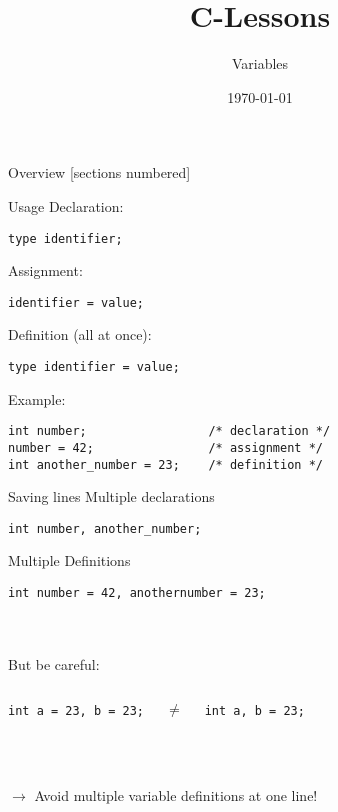 


\title{C-Lessons}
\subtitle{Variables}
\date{\today}



\begin{frame}
	\titlepage
\end{frame}
\begin{frame}{Overview}
	[sections numbered]
	\tableofcontents
\end{frame}

\begin{frame}[fragile]{Usage}
	Declaration:
	\begin{lstlisting}[numbers=none,basicstyle=\itshape\footnotesize]
type identifier;
\end{lstlisting}
	Assignment: 
	\begin{lstlisting}[numbers=none,basicstyle=\itshape\footnotesize]
identifier = value;
\end{lstlisting}
	Definition (all at once):
	\begin{lstlisting}[numbers=none,basicstyle=\itshape\footnotesize]
type identifier = value;
\end{lstlisting}
	Example:
	\begin{lstlisting}[numbers=none]
int number;                 /* declaration */
number = 42;                /* assignment */
int another_number = 23;    /* definition */

\end{lstlisting}
\end{frame}

\begin{frame}[fragile]{Saving lines}
	Multiple declarations
	\begin{lstlisting}[numbers=none]
int number, another_number;
\end{lstlisting}
	Multiple Definitions
	\begin{lstlisting}[numbers=none]
int number = 42, anothernumber = 23;
\end{lstlisting}\ \\\ \\
But be careful:
\begin{columns}[c]
	\begin{lstlisting}[numbers=none]
int a = 23, b = 23;
\end{lstlisting}
	\centering
	$\neq$
	\begin{lstlisting}[numbers=none]
int a, b = 23;
\end{lstlisting}
\end{columns}\ \\ \ \\
$\rightarrow$ Avoid multiple variable definitions at one line!
\end{frame}


